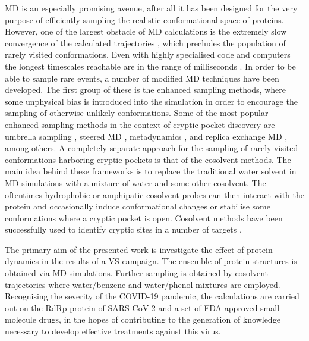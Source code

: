 MD is an especially promising avenue, after all it has been designed for the very purpose of efficiently sampling the realistic conformational space of proteins. However, one of the largest obstacle of MD calculations is the extremely slow convergence of the calculated trajectories \cite{ensemble_discovery}, which precludes the population of rarely visited conformations. Even with highly specialised code and computers the longest timescales reachable are in the range of milliseconds \cite{anton}. In order to be able to sample rare events, a number of modified MD techniques have been developed. The first group of these is the enhanced sampling methods, where some unphysical bias is introduced into the simulation in order to encourage the sampling of otherwise unlikely conformations. Some of the most popular enhanced-sampling methods in the context of cryptic pocket discovery are umbrella sampling \cite{umbrella}, steered MD \cite{steered_md}, metadynamics \cite{metadynamics}, and replica exchange MD \cite{replica_exchange}, among others. A completely separate approach for the sampling of rarely visited conformations harboring cryptic pockets is that of the cosolvent methods. The main idea behind these frameworks is to replace the traditional water solvent in MD simulations with a mixture of water and some other cosolvent.
The oftentimes hydrophobic or amphipatic cosolvent probes can then interact with the protein and occasionally induce conformational changes or stabilise some conformations where a cryptic pocket is open.
Cosolvent methods have been successfully used to identify cryptic sites in a number of targets \cite{cosolvent_framework,cosolvent_md,cosolvent_based,cryptic_review}.

The primary aim of the presented work is investigate the effect of protein dynamics in the results of a VS campaign. The ensemble of protein structures is obtained via MD simulations. Further sampling is obtained by cosolvent trajectories where water/benzene and water/phenol mixtures are employed. Recognising the severity of the COVID-19 pandemic, the calculations are carried out on the RdRp protein of SARS-CoV-2 and a set of FDA approved small molecule drugs, in the hopes of contributing to the generation of knowledge necessary to develop effective treatments against this virus. 
